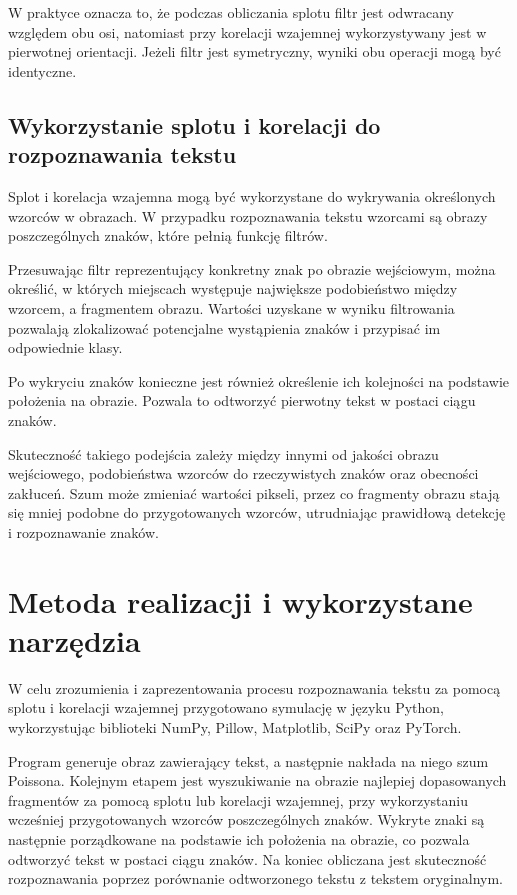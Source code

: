 \documentclass{article}
\begin{document}
W praktyce oznacza to, że podczas obliczania splotu filtr jest odwracany względem obu osi, natomiast przy korelacji wzajemnej wykorzystywany jest w pierwotnej orientacji. Jeżeli filtr jest symetryczny, wyniki obu operacji mogą być identyczne.

\subsection{Wykorzystanie splotu i korelacji do rozpoznawania tekstu}
Splot i korelacja wzajemna mogą być wykorzystane do wykrywania określonych wzorców w obrazach. W przypadku rozpoznawania tekstu wzorcami są obrazy poszczególnych znaków, które pełnią funkcję filtrów.

Przesuwając filtr reprezentujący konkretny znak po obrazie wejściowym, można określić, w których miejscach występuje największe podobieństwo między wzorcem, a fragmentem obrazu. Wartości uzyskane w wyniku filtrowania pozwalają zlokalizować potencjalne wystąpienia znaków i przypisać im odpowiednie klasy.

Po wykryciu znaków konieczne jest również określenie ich kolejności na podstawie położenia na obrazie. Pozwala to odtworzyć pierwotny tekst w postaci ciągu znaków.

Skuteczność takiego podejścia zależy między innymi od jakości obrazu wejściowego, podobieństwa wzorców do rzeczywistych znaków oraz obecności zakłuceń. Szum może zmieniać wartości pikseli, przez co fragmenty obrazu stają się mniej podobne do przygotowanych wzorców, utrudniając prawidłową detekcję i rozpoznawanie znaków.

\section{Metoda realizacji i wykorzystane narzędzia}
W celu zrozumienia i zaprezentowania procesu rozpoznawania tekstu za pomocą splotu i korelacji wzajemnej przygotowano symulację w języku Python, wykorzystując biblioteki NumPy, Pillow, Matplotlib, SciPy oraz PyTorch.

Program generuje obraz zawierający tekst, a następnie nakłada na niego szum Poissona. Kolejnym etapem jest wyszukiwanie na obrazie najlepiej dopasowanych fragmentów za pomocą splotu lub korelacji wzajemnej, przy wykorzystaniu wcześniej przygotowanych wzorców poszczególnych znaków. Wykryte znaki są następnie porządkowane na podstawie ich położenia na obrazie, co pozwala odtworzyć tekst w postaci ciągu znaków. Na koniec obliczana jest skuteczność rozpoznawania poprzez porównanie odtworzonego tekstu z tekstem oryginalnym.
\end{document}

